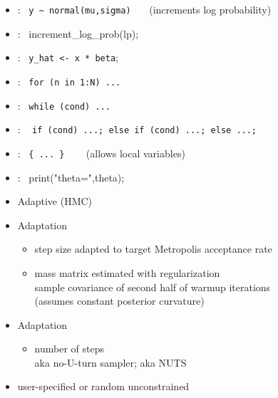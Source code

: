 \documentclass[10pt]{report}
\newcommand{\sld}[1]{\newpage{\noindent\LARGE \ \ \
    \textcolor{MidnightBlue}{\bfseries #1}}\vspace*{4pt}}
\newcommand{\code}[1]{{\tt #1}}
\newcommand{\myemph}[1]{{\color{MidnightBlue}{\bfseries #1}}}
\begin{document}
\begin{itemize}
\item \myemph{Sampling}: \ {\footnotesize \Verb|y ~ normal(mu,sigma)|}
\ \ \ {\footnotesize (increments log probability)}
%
\item \myemph{Log probability}: \ {\footnotesize increment\_log\_prob(lp);}
\item \myemph{Assignment}: \  {\footnotesize \code{y\_hat <- x * beta};}
%
\item \myemph{For loop}: \ {\footnotesize \code{for (n in 1:N) ...}}
%
\item \myemph{While loop}: \ {\footnotesize \code{while (cond) ...}}
%
\item \myemph{Conditional}: \ {\footnotesize
\code{if (cond) ...; else if (cond) ...;  else ...;}}
\item \myemph{Block}: \ {\footnotesize \Verb|{ ... }|}  \ \ \ {\footnotesize
   (allows local variables)}
\item \myemph{Print}: \ {\footnotesize print("theta=",theta);}
\end{itemize}

\sld{Full Bayes with MCMC}

\begin{itemize}
\item Adaptive \myemph{Hamiltonian Monte Carlo} (HMC)
%
\item Adaptation \myemph{during warmup}
\vspace*{-4pt}
\begin{itemize}\small
\item step size adapted to target Metropolis acceptance rate
\item mass matrix estimated with regularization
{\footnotesize
\\ sample covariance of second half of warmup iterations
\\ (assumes constant posterior curvature)
}
\end{itemize}
%
\item Adaptation \myemph{during sampling}
\vspace*{-4pt}
\begin{itemize}\small
\item number of steps
\\
{\footnotesize aka no-U-turn sampler; aka NUTS}
\end{itemize}
%
\item \myemph{Initialization} user-specified or random unconstrained
\end{itemize}
\end{document}
